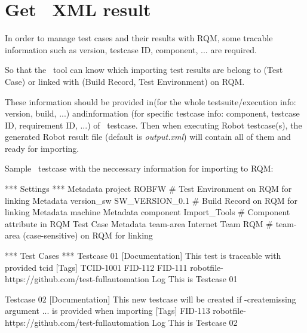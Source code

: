 



\hypertarget{description-get-robotframework-xml-result}{%
\section{Get \rfwcore\ XML result}
\label{description-get-robotframework-xml-result}}

In order to manage test cases and their results with RQM, some tracable 
information such as version, testcase ID, component, ... are required.

So that the \pkg\ tool can know which importing test results are
belong to (Test Case) or linked with (Build Record, Test Environment) on RQM.

These information should be provided in(for the whole
testsuite/execution info: version, build, ...) and\rcode{{[}Tags{]}}information 
(for specific testcase info: component, testcase ID, requirement ID, ...) of
\rfwcore\ testcase. 
Then when executing Robot testcase(s), the generated Robot result file (default 
is \emph{output.xml}) will contain all of them and ready for importing.

Sample \rfwcore\ testcase with the neccessary information for importing to RQM:

\begin{robotcode}[caption=Sample \rfwcore\ testcase,
                  linebackgroundcolor=\hlcode{2,3,4}]
*** Settings ***
Metadata   project      ROBFW             # Test Environment on RQM for linking
Metadata   version_sw   SW_VERSION_0.1    # Build Record on RQM for linking
Metadata   machine      %
Metadata   component    Import_Tools      # Component attribute in RQM Test Case
Metadata   team-area    Internet Team RQM  # team-area (case-sensitive) on RQM for linking

*** Test Cases ***
Testcase 01
   [Documentation]   This test is traceable with provided tcid
   [Tags]   TCID-1001   FID-112   FID-111    robotfile-https://github.com/test-fullautomation
   Log      This is Testcase 01

Testcase 02
   [Documentation]  This new testcase will be created if -createmissing argument
               ...  is provided when importing
   [Tags]   FID-113  robotfile-https://github.com/test-fullautomation
   Log      This is Testcase 02
\end{robotcode}

